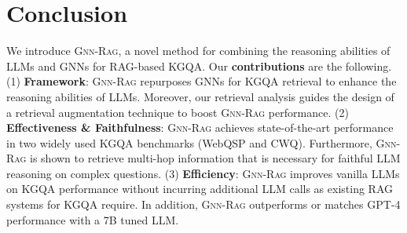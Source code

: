 \documentclass{article}
\newcommand{\grag}{\textsc{Gnn-Rag}\xspace}
\theoremstyle{plain}
\theoremstyle{definition}
\theoremstyle{remark}
\begin{document}
\section{Conclusion}

We introduce \grag, a novel method for combining the reasoning abilities of LLMs and
GNNs for RAG-based KGQA. Our \textbf{contributions} are the following. (1) \textbf{Framework}: \grag repurposes GNNs for KGQA retrieval to enhance the reasoning
abilities of LLMs. Moreover, our retrieval analysis guides the design of a
retrieval augmentation technique to boost \grag performance. (2) \textbf{Effectiveness \& Faithfulness}: \grag achieves state-of-the-art performance in two
widely used KGQA benchmarks (WebQSP and CWQ). Furthermore, \grag is shown to retrieve multi-hop information that is necessary for faithful LLM reasoning on complex questions. (3) \textbf{Efficiency}: \grag improves vanilla LLMs on KGQA performance without incurring additional LLM calls as existing RAG systems for KGQA require. In addition, \grag outperforms or matches GPT-4 performance with a 7B tuned LLM.

\newpage





\end{document}
